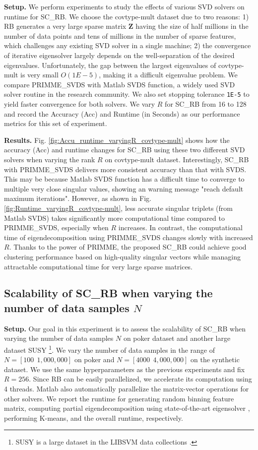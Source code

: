 \documentclass[sigconf]{acmart}
\newcommand{\1}{\boldsymbol{1}}
\newcommand{\bZ}{\mathbf{Z}}
\newcommand{\0}{\boldsymbol{0}}
\begin{document}
\textbf{Setup.} We perform experiments to study the effects of various SVD solvers on runtime for SC\_RB. We choose the covtype-mult dataset due to two reasons: 1) RB generates a very large sparse matrix $\bZ$ having the size of half millions in the number of data points and tens of millions in the number of sparse features, which challenges any existing SVD solver in a single machine; 2) the convergence of iterative eigensolver largely depends on the well-separation of the desired eigenvalues. Unfortunately, the gap between the largest eigenvalues of covtype-mult is very small $O(1E-5)$, making it a difficult eigenvalue problem. We compare PRIMME\_SVDS with Matlab SVDS function, a widely used SVD solver routine in the research community. We also set stopping tolerance \texttt{1E-5} to yield faster convergence for both solvers. We vary $R$ for SC\_RB from 16 to 128 and record the Accuracy (Acc) and Runtime (in Seconds) as our performance metrics for this set of experiment. 

\textbf{Results.} 
Fig. \ref{fig:Accu_runtime_varyingR_covtype-mult} shows how the accuracy (Acc) and runtime changes for SC\_RB using these two different SVD solvers when varying the rank $R$ on covtype-mult dataset. Interestingly, SC\_RB with PRIMME\_SVDS delivers more consistent accuracy than that with SVDS. This may be because Matlab SVDS function has a difficult time to converge to multiple very close singular values, showing an warning message "reach default maximum iterations". However, as shown in Fig. \ref{fig:Runtime_varyingR_covtype-mult}, less accurate singular triplets (from Matlab SVDS) takes significantly more computational time compared to PRIMME\_SVDS, especially when $R$ increases. In contrast, the computational time of eigendecomposition using PRIMME\_SVDS changes slowly with increased $R$. Thanks to the power of PRIMME, the proposed SC\_RB could achieve good clustering performance based on high-quality singular vectors while managing attractable computational time for very large sparse matrices. 


\subsection{Scalability of SC\_RB when varying the number of data samples $N$}

\textbf{Setup.} Our goal in this experiment is to assess the scalability of SC\_RB when varying the number of data samples $N$ on poker dataset and another large dataset SUSY \footnote{SUSY is a large dataset in the LIBSVM data collections \cite{chang2011libsvm}.}. 
We vary the number of data samples in the range of $N = [100 \ \ 1,000,000]$ on poker and $N = [4000 \ \ 4,000,000]$ on the synthetic dataset.
We use the same hyperparameters as the previous experiments and fix $R = 256$. Since RB can be easily parallelized, we accelerate its computation using 4 threads. Matlab also automatically parallelize the matrix-vector operations for other solvers. We report the runtime for generating random binning feature matrix, computing partial eigendecomposition using state-of-the-art eigensolver \cite{stathopoulos2010primme,wu2017primme_svds}, performing K-means, and the overall runtime, respectively.
\end{document}
